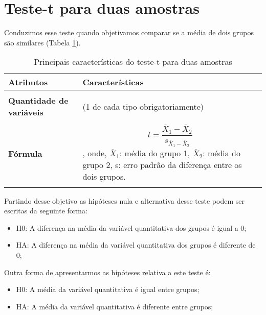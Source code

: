 \documentclass[14pt,titlepage, oneside, openany, a4paper]{book}
\begin{document}
\hypertarget{teste-t-para-duas-amostras}{%
\section{Teste-t para duas amostras}\label{teste-t-para-duas-amostras}}

Conduzimos esse teste quando objetivamos comparar se a média de dois grupos são similares (Tabela \ref{tab:tab2t}).

\begin{table}

\caption{\label{tab:tab2t}Principais características do teste-t para duas amostras}
\centering
\begin{tabular}[c]{>{\raggedright\arraybackslash}p{10em}>{\raggedright\arraybackslash}p{30em}}
\toprule
Atributos & Características\\
\midrule
\textbf{\cellcolor{gray!6}{Tipo de variável}} & \cellcolor{gray!6}{Quantitativa e categórica}\\
\textbf{Quantidade de variáveis} & 2 (1 de cada tipo obrigatoriamente)\\
\textbf{\cellcolor{gray!6}{Hipótese nula}} & \cellcolor{gray!6}{A diferença na média da variável quantitativa dos grupos é igual a 0.}\\
\textbf{Fórmula} & $$t=\frac{\overline{X}_1-\overline{X}_2}{s_{\overline{X}_1-\overline{X}_2}}$$, onde, $\overline{X}_1$: média do grupo 1, $\overline{X}_2$: média do grupo 2, s: erro padrão da diferença entre os dois grupos.\\
\textbf{\cellcolor{gray!6}{Observação}} & \cellcolor{gray!6}{Não há a necessidade de post-hoc nem expressa-la graficamente.}\\
\bottomrule
\end{tabular}
\end{table}

Partindo desse objetivo as hipóteses nula e alternativa desse teste podem ser escritas da seguinte forma:

\begin{itemize}
\item
  H0: A diferença na média da variável quantitativa dos grupos é igual a 0;
\item
  HA: A diferença na média da variável quantitativa dos grupos é diferente de 0;
\end{itemize}

Outra forma de apresentarmos as hipóteses relativa a este teste é:

\begin{itemize}
\item
  H0: A média da variável quantitativa é igual entre grupos;
\item
  HA: A média da variável quantitativa é diferente entre grupos;
\end{itemize}
\end{document}
